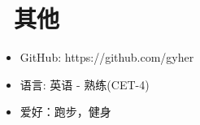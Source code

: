 \documentclass{resume}
\begin{document}

\section{\faInfo\ 其他}
\begin{itemize}[parsep=0.5ex]
  \item GitHub: https://github.com/gyher
  \item 语言: 英语 - 熟练(CET-4)
  \item 爱好：跑步，健身
\end{itemize}

%
%
\end{document}
